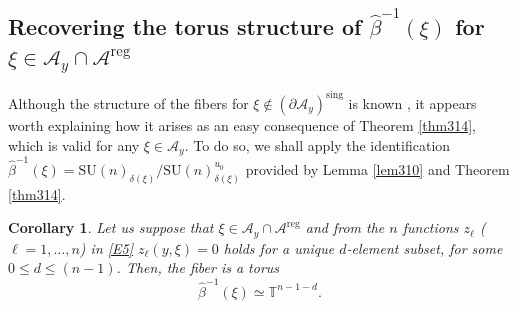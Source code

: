\documentclass[a4paper,11pt,reqno]{amsart}
\newtheorem{cor}[thm]{Corollary}
\theoremstyle{definition}
\numberwithin{equation}{section}
\newcommand{\be}{\begin{equation}}
\newcommand{\ee}{\end{equation}}
\def\cA{{\mathcal A}}                       %
\def\sing{\mathrm{sing}}                    %
\def\bT{{\mathbb T}}                        %
\def\reg{\mathrm{reg}}                      %
\def\SU{\mathrm{SU}}                        %
\def\reg{\mathrm{reg}}                      %
\begin{document}
\subsection{Recovering the torus structure of $\hat \beta^{-1}(\xi)$ for $\xi\in \cA_y \cap \cA^\reg$}\label{Sec32}

Although the structure of the fibers for $\xi \notin (\partial \cA_y)^\sing$ is known \cite{FK}, it appears worth
explaining how it arises as an easy consequence of Theorem \ref{thm314}, which is valid for any $\xi \in \cA_y$.
To do so, we shall apply the identification $\hat \beta^{-1}(\xi) = \SU(n)_{\delta(\xi)}/\SU(n)_{\delta(\xi)}^{u_0}$ provided
by Lemma \ref{lem310} and Theorem \ref{thm314}.

\begin{cor}\label{corG12}
Let us suppose that $\xi \in \cA_y \cap \cA^\reg$ and from the $n$ functions  $z_\ell$ ($\ell=1,\dots, n$)  in \eqref{E5}
$z_\ell(y,\xi)=0$  holds for a unique $d$-element subset, for some $0\leq d \leq (n-1)$.
Then, the fiber is a torus
\be
\hat \beta^{-1}(\xi) \simeq \bT^{n-1-d}.
\label{G32}\ee
\end{cor}
\end{document}
